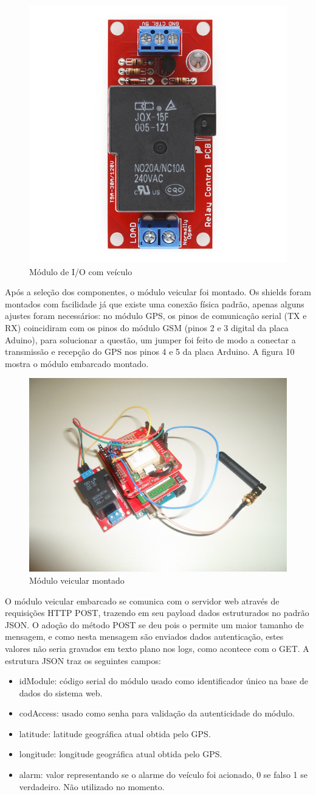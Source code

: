 \begin{figure}[!htb]
	\centering
	\includegraphics[width=5.00cm\textwidth]{figures/beefcake2.jpg}
	\caption{Módulo de I/O com veículo}
	\label{Figura 9}
\end{figure}

Após a seleção dos componentes, o módulo veicular foi montado. Os shields foram montados com facilidade já que
existe uma conexão física padrão, apenas alguns ajustes foram necessários: no módulo GPS, os pinos de comunicação
serial (TX e RX) coincidiram com os pinos do módulo GSM (pinos 2 e 3 digital da placa Aduino), para solucionar
a questão, um jumper foi feito de modo a conectar a transmissão e recepção do GPS nos pinos 4 e 5 da placa Arduino.
A figura 10 mostra o módulo embarcado montado.

\begin{figure}[!htb]
	\centering
	\includegraphics[width=5.00cm\textwidth]{figures/prototipo_4.jpg}
	\caption{Módulo veicular montado}
	\label{Figura 10}
\end{figure}

O módulo veicular embarcado se comunica com o servidor web através de requisições HTTP POST, trazendo em seu
payload dados estruturados no padrão JSON. O adoção do método POST se deu pois o permite um maior tamanho de
mensagem, e como nesta mensagem são enviados dados autenticação, estes valores não seria gravados em texto
plano nos logs, como acontece com o GET. A estrutura JSON traz os seguintes campos:

\begin{itemize}
	\item idModule: código serial do módulo usado como identificador único na base de dados do sistema web.
	\item codAccess: usado como senha para validação da autenticidade do módulo.
	\item latitude: latitude geográfica atual obtida pelo GPS.
	\item longitude: longitude geográfica atual obtida pelo GPS.
	\item alarm: valor representando se o alarme do veículo foi acionado, 0 se falso 1 se verdadeiro. Não utilizado no momento.
\end{itemize}

